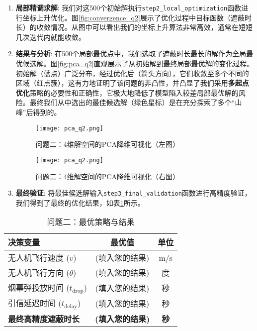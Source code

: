 \documentclass[12pt]{article}
\newcommand{\code}[1]{\texttt{#1}} %
\begin{document}
\begin{CJK}{UTF8}{gbsn}
\begin{enumerate}
		\item \textbf{局部精调求解}: 我们对这500个初始解执行\code{step2\_local\_optimization}函数进行坐标上升优化。图\ref{fig:convergence_q2}展示了优化过程中目标函数（遮蔽时长）的收敛情况。从图中可以看出我们的坐标上升算法非常高效，通常在短短几次迭代内就能收敛。
		
		\item \textbf{结果与分析}: 在500个局部最优点中，我们选取了遮蔽时长最长的解作为全局最优候选解。图\ref{fig:pca_q2}直观展示了从初始解到最终局部最优解的变化过程。初始解（蓝点）广泛分布，经过优化后（箭头方向），它们收敛至多个不同的区域（红点簇），这有力地证明了该问题的非凸性，并凸显了我们采用\textbf{多起点优化}策略的必要性和正确性，它极大地降低了模型陷入较差局部最优解的风险。最终我们从中选出的最佳候选解（绿色星标）是在充分探索了多个“山峰”后得到的。
		
	\begin{figure}[H]
		\centering
		\begin{minipage}{0.48\textwidth}
			\centering
			\texttt{[image: pca\_q2.png]} %
			\caption{问题二：4维解空间的PCA降维可视化（左图）}
			\label{fig:pca_q2_left}
		\end{minipage}
		\hfill %
		\begin{minipage}{0.48\textwidth}
			\centering
			\texttt{[image: pca\_q2.png]} %
			\caption{问题二：4维解空间的PCA降维可视化（右图）}
			\label{fig:pca_q2_right}
		\end{minipage}
	\end{figure}
		
		\item \textbf{最终验证}: 将最佳候选解输入\code{step3\_final\_validation}函数进行高精度验证，我们得到了最终的优化结果，如表\ref{tab:results_q2}所示。
	\end{enumerate}
	
	\begin{table}[H]
		\centering
		\caption{问题二：最优策略与结果}
		\label{tab:results_q2}
		\begin{tabular}{@{}lcc@{}}
			\toprule
			决策变量               & 最优值      & 单位 \\ \midrule
			无人机飞行速度 ($v$)     & (填入您的结果) & m/s  \\
			无人机飞行方向 ($\theta$)    & (填入您的结果) & 度   \\
			烟幕弹投放时间 ($t_{\text{drop}}$) & (填入您的结果) & 秒   \\
			引信延迟时间 ($t_{\text{delay}}$)   & (填入您的结果) & 秒   \\ \midrule
			\textbf{最终高精度遮蔽时长} & \textbf{(填入您的结果)} & \textbf{秒}   \\ \bottomrule
		\end{tabular}
	\end{table}
	

\end{CJK}
\end{document}
